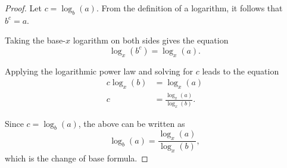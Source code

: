 \documentclass[parskip, headings=standardclasses]{scrartcl}
\begin{document}
\begin{proof}
  Let \(c = \log_{b}(a)\). From the definition of a logarithm, it follows that
  \(b^c = a\).

  Taking the base-\(x\) logarithm on both sides gives the equation
  \begin{equation*}
    \log_{x}(b^c) = \log_{x}(a).
  \end{equation*}

  Applying the logarithmic power law and solving for \(c\) leads to the equation
  \begin{equation*}
    \begin{split}
      c\log_{x}(b) &= \log_{x}(a) \\
      c &= \frac{\log_{x}(a)}{\log_{x}(b)}.
    \end{split}
  \end{equation*}

  Since \(c = \log_{b}(a)\), the above can be written as
  \begin{equation*}
    \log_{b}(a) = \frac{\log_{x}(a)}{\log_{x}(b)},
  \end{equation*}
  which is the change of base formula.
\end{proof}
\end{document}
